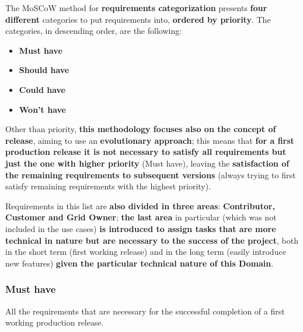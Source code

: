 The MoSCoW method for \textbf{requirements categorization} presents \textbf{four different} categories to put requirements into, \textbf{ordered by priority}. The categories, in descending order, are the following:
\begin{itemize}
    \item \textbf{Must have}
    \item \textbf{Should have}
    \item \textbf{Could have}
    \item \textbf{Won't have}
\end{itemize}
Other than priority, \textbf{this methodology focuses also on the concept of release}, aiming to use an \textbf{evolutionary approach}; this means that \textbf{for a first production release it is not necessary to satisfy all requirements but just the one with higher priority} (Must have), leaving the \textbf{satisfaction of the remaining requirements to subsequent versions} (always trying to first satisfy remaining requirements with the highest priority).

Requirements in this list are \textbf{also divided in three areas}: \textbf{Contributor, Customer and Grid Owner}; \textbf{the last area} in particular (which was not included in the use cases) \textbf{is introduced to assign tasks that are more technical in nature but are necessary to the success of the project}, both in the short term (first working release) and in the long term (easily introduce new features) \textbf{given the particular technical nature of this Domain}.

\subsubsection{Must have}
All the requirements that are necessary for the successful completion of a first working production release.

